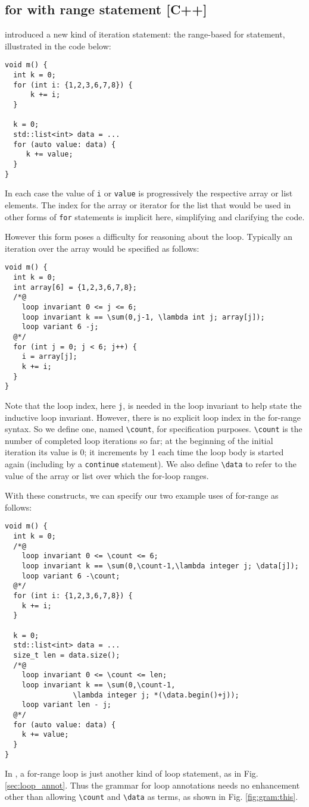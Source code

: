 \subsection{for with range statement [C++]}

\lang introduced a new kind of iteration statement: the range-based for statement, illustrated in the code below:
\begin{lstlisting}
void m() {
  int k = 0;
  for (int i: {1,2,3,6,7,8}) {
      k += i;
  }
  
  k = 0;
  std::list<int> data = ...
  for (auto value: data) {
     k += value;
  }
}
\end{lstlisting}

In each case the value of \lstinline|i| or \lstinline|value| is progressively the respective array or list elements. The  
index for the array or iterator for the list that would be used in other forms of \lstinline|for| statements is implicit here, simplifying and
clarifying the code.

However this form poses a difficulty for reasoning about the loop. Typically an iteration over the array would be specified as follows:
\begin{lstlisting}
void m() {
  int k = 0;
  int array[6] = {1,2,3,6,7,8};
  /*@
    loop invariant 0 <= j <= 6;
    loop invariant k == \sum(0,j-1, \lambda int j; array[j]);
    loop variant 6 -j;
  @*/
  for (int j = 0; j < 6; j++) {
    i = array[j];
    k += i;
  }
}
\end{lstlisting}

Note that the loop index, here \lstinline|j|, is needed in the loop invariant to help state the inductive loop invariant. However, there is no explicit loop index in the
for-range syntax. So we define one, named \lstinline|\count|, for specification purposes.
\lstinline|\count| is the number of completed loop iterations so far; 
at the beginning of the initial iteration its value is 0; it 
increments by 1 each time the loop body is started again (including by a
\lstinline|continue| statement).
We also define \lstinline|\data| to refer to the value of the array or list over which the for-loop ranges.

With these constructs, we can specify our two example uses of for-range as follows:
\begin{lstlisting}
void m() {
  int k = 0;
  /*@
    loop invariant 0 <= \count <= 6;
    loop invariant k == \sum(0,\count-1,\lambda integer j; \data[j]);
    loop variant 6 -\count;
  @*/
  for (int i: {1,2,3,6,7,8}) {
    k += i;
  }

  k = 0;
  std::list<int> data = ...
  size_t len = data.size();
  /*@
    loop invariant 0 <= \count <= len;
    loop invariant k == \sum(0,\count-1,
                \lambda integer j; *(\data.begin()+j));
    loop variant len - j;
  @*/
  for (auto value: data) {
    k += value;
  }
}
\end{lstlisting}

In \lang, a for-range loop is just another kind of loop statement, as in Fig. \ref{sec:loop_annot}. Thus the grammar for loop annotations needs no enhancement other than
allowing \lstinline|\count| and \lstinline|\data| as terms, as shown in Fig. \ref{fig:gram:this}.

